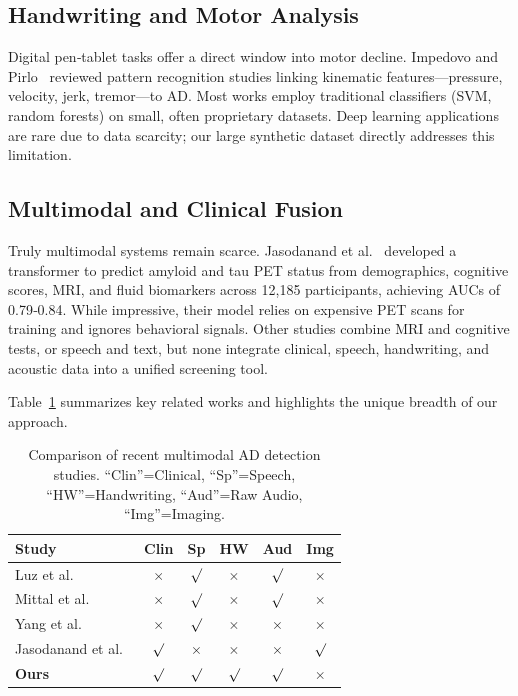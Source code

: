 \documentclass[conference]{IEEEtran}
\begin{document}
\subsection{Handwriting and Motor Analysis}
Digital pen‑tablet tasks offer a direct window into motor decline. Impedovo and Pirlo~\cite{impedovo2019} reviewed pattern recognition studies linking kinematic features—pressure, velocity, jerk, tremor—to AD. Most works employ traditional classifiers (SVM, random forests) on small, often proprietary datasets. Deep learning applications are rare due to data scarcity; our large synthetic dataset directly addresses this limitation.

\subsection{Multimodal and Clinical Fusion}
Truly multimodal systems remain scarce. Jasodanand et al.~\cite{jasodanand2025} developed a transformer to predict amyloid and tau PET status from demographics, cognitive scores, MRI, and fluid biomarkers across 12,185 participants, achieving AUCs of 0.79‑0.84. While impressive, their model relies on expensive PET scans for training and ignores behavioral signals. Other studies combine MRI and cognitive tests, or speech and text, but none integrate clinical, speech, handwriting, and acoustic data into a unified screening tool.

Table~\ref{tab:litcompare} summarizes key related works and highlights the unique breadth of our approach.

\begin{table}[htbp]
\centering
\caption{Comparison of recent multimodal AD detection studies. ``Clin''=Clinical, ``Sp''=Speech, ``HW''=Handwriting, ``Aud''=Raw Audio, ``Img''=Imaging.}
\label{tab:litcompare}
\begin{tabular}{@{}lccccc@{}}
\toprule
\textbf{Study} & \textbf{Clin} & \textbf{Sp} & \textbf{HW} & \textbf{Aud} & \textbf{Img} \\
\midrule
Luz et al.~\cite{luz2020adress} & $\times$ & $\surd$ & $\times$ & $\surd$ & $\times$ \\
Mittal et al.~\cite{mittal2021} & $\times$ & $\surd$ & $\times$ & $\surd$ & $\times$ \\
Yang et al.~\cite{yang2024} & $\times$ & $\surd$ & $\times$ & $\times$ & $\times$ \\
Jasodanand et al.~\cite{jasodanand2025} & $\surd$ & $\times$ & $\times$ & $\times$ & $\surd$ \\
\textbf{Ours} & $\surd$ & $\surd$ & $\surd$ & $\surd$ & $\times$ \\
\bottomrule
\end{tabular}
\end{table}
\end{document}
